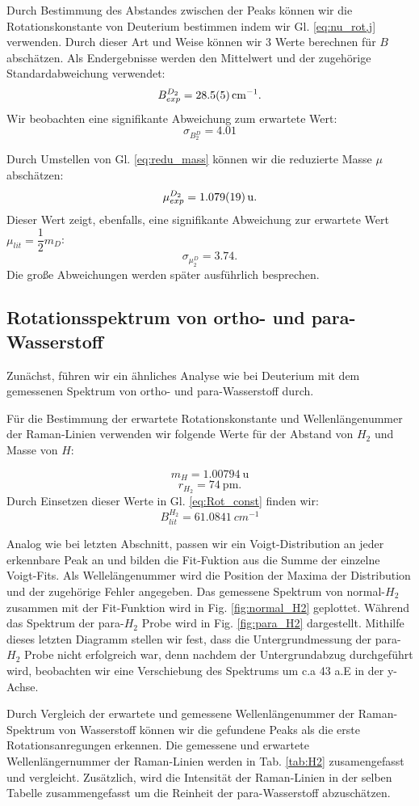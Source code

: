 \documentclass[11 pt]{article}
\begin{document}
Durch Bestimmung des Abstandes zwischen der Peaks können wir die Rotationskonstante von Deuterium bestimmen indem wir Gl. \ref{eq:nu_rot,j} verwenden. Durch dieser Art und Weise können wir 3 Werte berechnen für $B$ abschätzen. Als Endergebnisse werden den Mittelwert und der zugehörige  Standardabweichung verwendet: 
$$B_{exp}^{D_2} = \SI{28.5\pm 0.5}{cm^{-1}}.$$
Wir beobachten eine signifikante Abweichung zum erwartete Wert:
$$\sigma_{B^D_2} = 4.01$$ 
 
Durch Umstellen von Gl. \ref{eq:redu_mass} können wir die reduzierte Masse $\mu$ abschätzen:
$$\mu_{exp}^{D_2} = \SI{1.079\pm 0.019}{\atomicmassunit}.$$
Dieser Wert zeigt, ebenfalls, eine signifikante Abweichung zur erwartete Wert $\mu_{lit} = \dfrac{1}{2}m_D$:
$$\sigma_{\mu^D_2} = 3.74.$$
Die große Abweichungen werden später ausführlich besprechen. 

\subsection{Rotationsspektrum von ortho- und para-Wasserstoff}
Zunächst, führen wir ein ähnliches Analyse wie bei Deuterium mit dem gemessenen Spektrum von ortho- und para-Wasserstoff durch. 

Für die Bestimmung der erwartete Rotationskonstante und Wellenlängenummer der Raman-Linien verwenden wir folgende Werte für der Abstand von $H_2$ und Masse von $H$:

$$m_{H} =\SI{1.00794}{\atomicmassunit}$$
$$r_{H_2} = \SI{74}{\pm}.$$
Durch Einsetzen dieser Werte in Gl. \ref{eq:Rot_const} finden wir:
$$B_{lit}^{H_2} = \SI{61.0841}{cm^{-1}} $$

Analog wie bei letzten Abschnitt, passen wir ein Voigt-Distribution an jeder erkennbare Peak an und bilden die Fit-Fuktion aus die Summe der einzelne Voigt-Fits. Als Wellelängenummer wird die Position der Maxima der Distribution und der zugehörige Fehler angegeben. Das gemessene Spektrum von normal-$H_2$ zusammen mit der Fit-Funktion wird in Fig. \ref{fig:normal_H2} geplottet. Während das Spektrum der para-$H_2$ Probe wird in Fig. \ref{fig:para_H2} dargestellt. Mithilfe dieses letzten Diagramm stellen wir fest, dass die Untergrundmessung der para-$H_2$ Probe nicht erfolgreich war, denn nachdem der Untergrundabzug durchgeführt wird, beobachten wir eine Verschiebung des Spektrums um c.a 43 a.E in der y-Achse. 

Durch Vergleich der erwartete und gemessene Wellenlängenummer der Raman-Spektrum von Wasserstoff können wir die gefundene Peaks als die erste Rotationsanregungen erkennen. Die gemessene und erwartete Wellenlängernummer der Raman-Linien werden in Tab. \ref{tab:H2} zusamengefasst und vergleicht. Zusätzlich, wird die Intensität der Raman-Linien in der selben Tabelle zusammengefasst um die Reinheit der para-Wasserstoff abzuschätzen. 
\end{document}
